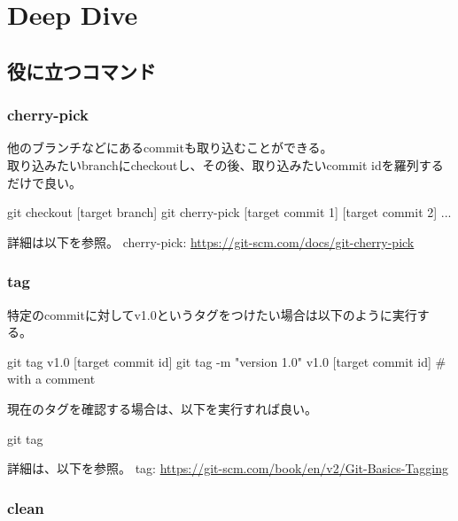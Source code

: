 \documentclass[10pt,a4j,openany,dvipdfmx]{jsarticle}
\begin{document}
\section{Deep Dive} %
\label{sec:Deep Dive}


\subsection{役に立つコマンド} %
\label{sub:役に立つコマンド}


\subsubsection{cherry-pick} %
\label{ssub:cherry_pick}

他のブランチなどにあるcommitも取り込むことができる。\\
取り込みたいbranchにcheckoutし、その後、取り込みたいcommit idを羅列するだけで良い。
\begin{commandshell}
git checkout [target branch]
git cherry-pick [target commit 1] [target commit 2] ...
\end{commandshell}

詳細は以下を参照。
cherry-pick: \url{https://git-scm.com/docs/git-cherry-pick}

\subsubsection{tag} %
\label{ssub:tag}

特定のcommitに対してv1.0というタグをつけたい場合は以下のように実行する。
\begin{commandshell}
git tag v1.0 [target commit id]
git tag -m "version 1.0" v1.0 [target commit id]   # with a comment
\end{commandshell}

現在のタグを確認する場合は、以下を実行すれば良い。
\begin{commandshell}
git tag
\end{commandshell}

詳細は、以下を参照。
tag: \url{https://git-scm.com/book/en/v2/Git-Basics-Tagging}

\subsubsection{clean} %
\label{ssub:clean}
\end{document}
